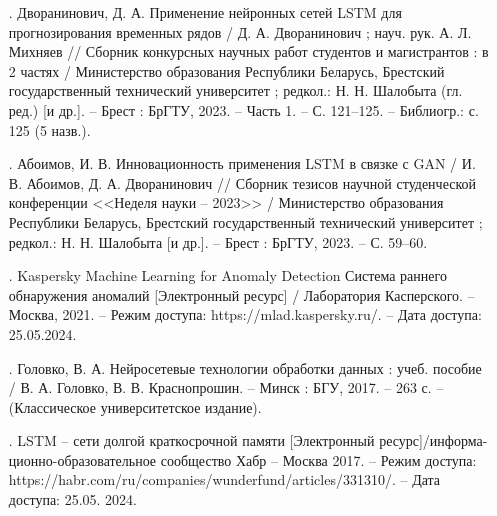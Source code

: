 {\begin{itemize}[leftmargin=2.15cm, labelwidth=0.65cm, labelsep=0.0cm]
    \item[\theimagecntr.] Дворанинович, Д. А. Применение нейронных сетей LSTM для прогнозирования временных рядов / Д. А. Дворанинович ; науч. рук. А. Л. Михняев // Сборник конкурсных научных работ студентов и магистрантов : в 2 частях / Министерство образования Республики Беларусь, Брестский государственный технический университет ; редкол.: Н. Н. Шалобыта (гл. ред.) [и др.]. {--} Брест : БрГТУ, 2023. {--} Часть 1. {--} С. 121–125. – Библиогр.: с. 125 (5 назв.).
    \addtocounter{imagecntr}{1}

    \item[\theimagecntr.] Абоимов, И. В. Инновационность применения LSTM в связке с GAN / И. В. Абоимов, Д. А. Дворанинович // Сборник тезисов научной студенческой конференции <<Неделя науки {--} 2023>> / Министерство образования Республики Беларусь, Брестский государственный технический университет ; редкол.: Н. Н. Шалобыта [и др.]. {--} Брест : БрГТУ, 2023. {--} С. 59–60.
    \addtocounter{imagecntr}{1}

    \item[\theimagecntr.] Kaspersky Machine Learning for Anomaly Detection Система раннего обнаружения аномалий [Электронный ресурс] / Лаборатория Касперского. {--} Москва, 2021. {--} Режим доступа: https://mlad.kaspersky.ru/. – Дата доступа: 25.05.2024.
    \addtocounter{imagecntr}{1}

    \item[\theimagecntr.] Головко, В. А. Нейросетевые технологии обработки данных : учеб. пособие / В. А. Головко, В. В. Краснопрошин. {--} Минск : БГУ, 2017. {--} 263 с. {--} (Классическое университетское издание).
    \addtocounter{imagecntr}{1}

    \item[\theimagecntr.] LSTM {--} сети долгой краткосрочной памяти [Электронный ресурс]/информа- ционно-образовательное сообщество Хабр {--} Москва 2017. {--} Режим доступа: https://habr.com/ru/companies/wunderfund/articles/331310/. {--} Дата доступа: 25.05. 2024.
    \addtocounter{imagecntr}{1}
    
\end{itemize}

}
